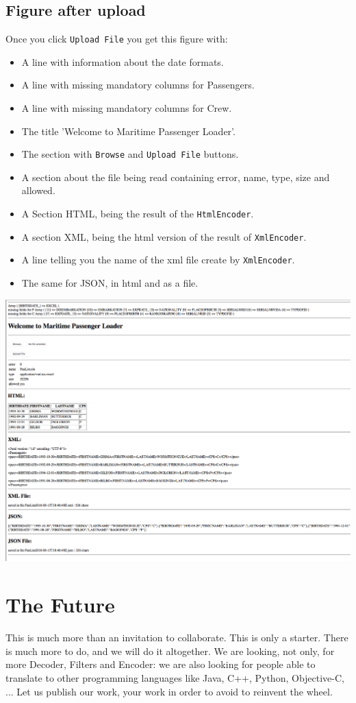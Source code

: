 \documentclass[a4paper, 11pt]{article}
\begin{document}
\subsection{Figure after upload}
\label{fig:after}
Once you click \texttt{Upload File} you get this figure with:
\begin{itemize}
\item A line with information about the date formats.
\item A line with missing mandatory columns for Passengers.
\item A line with missing mandatory columns for Crew.
\item The title 'Welcome to Maritime Passenger Loader'.
\item The section with \texttt{Browse} and \texttt{Upload File} buttons.
\item A section about the file being read containing error, name, type, size and allowed.
\item A Section HTML, being the result of the \texttt{HtmlEncoder}.
\item A section XML, being the html version of the result of \texttt{XmlEncoder}.
\item A line telling you the name of the xml file create by \texttt{XmlEncoder}.
\item The same for JSON, in html and as a file.
\end{itemize}
\includegraphics{figures/after}

\section{The Future}
This is much more than an invitation to collaborate. This is only a starter. There is much more to do, and we will do it altogether. We are looking, not only, for more Decoder, Filters and Encoder: we are also looking for people able to translate to other programming languages like Java, C++, Python, Objective-C, ... Let us publish our work, your work in order to avoid to reinvent the wheel. 
\end{document}
